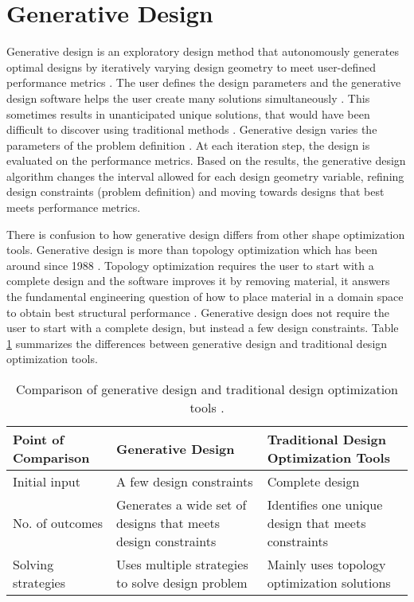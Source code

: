 \section{Generative Design}
Generative design is an exploratory design method that autonomously 
generates optimal designs by iteratively varying design geometry 
to meet user-defined performance metrics 
\cite{krish_practical_2011,oh_deep_2019}.
The user defines the design parameters and the generative 
design software helps the user create many solutions 
simultaneously \cite{autodesk_autodesk_2020}. 
This sometimes results in unanticipated unique solutions, that 
would have been difficult to discover using traditional methods
\cite{autodesk_autodesk_2020}.
Generative design varies the parameters of the problem definition
\cite{matejka_dream_2018}. 
At each iteration step, the design is evaluated on the 
performance metrics. 
Based on the results, the generative design algorithm changes the 
interval allowed for each design geometry variable, refining 
design constraints (problem definition) and moving towards 
designs that best meets performance metrics.

There is confusion to how generative design differs from other shape 
optimization tools. 
Generative design is more than topology optimization which has been 
around since 1988 \cite{bendsoe_generating_1988}. 
Topology optimization requires the user to start with a complete design 
and the software improves it by removing material, it answers the 
fundamental engineering question of how to place material in a domain space 
to obtain best structural performance \cite{sigmund_topology_2013}.   
Generative design does not require the user to start with a complete design, but 
instead a few design constraints. 
Table \ref{tab:compare} summarizes the differences between generative design and 
traditional design optimization tools. 

\begin{table}[!htbp]
        \caption{Comparison of generative design and traditional design optimization tools
        \cite{autodesk_fusion_2020}.}
        \label{tab:compare}
        \centering
        \doublespacing
        \small
        \begin{tabular}{p{3.7cm}|p{5.5cm}p{6cm}}
        \hline
        \textbf{Point of Comparison} & \textbf{Generative Design} & \textbf{Traditional Design Optimization Tools}  \\ \hline
        Initial input & A few design constraints & Complete design \\ 
        No. of outcomes & Generates a wide set of designs that meets design constraints & Identifies one unique design that meets constraints \\   
        Solving strategies & Uses multiple strategies to solve design problem & Mainly uses topology optimization solutions \\ \hline
        \end{tabular}
\end{table}

